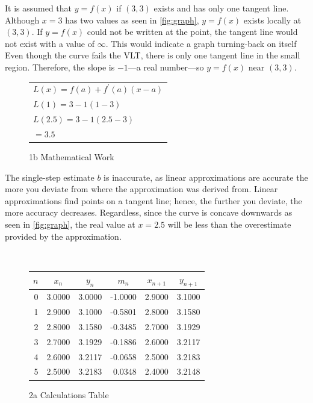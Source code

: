 \documentclass[answers,addpoints]{exam}
\begin{document}
\begin{questions}
\begin{solution}
    It is assumed that $y=f(x)$ if $(3,3)$ exists and has only one tangent line. Although $x=3$ has two values as seen in \ref{fig:graph}, $y=f(x)$ exists locally at $(3,3)$. If $y=f(x)$ could not be written at the point, the tangent line would not exist with a value of $\infty$. This would indicate a graph turning-back on itself Even though the curve fails the VLT, there is only one tangent line in the small region. Therefore, the slope is $-1$—a real number—so $y=f(x)$ near $(3,3)$.

    \begin{figure}[H]
      \centering
      \begin{tabular}{@{}l@{}}
        $\displaystyle L(x)=f(a)+f^\prime(a)(x-a)$ \\[6pt]
        $\displaystyle L(1)=3-1(1-3)$ \\[6pt]
        $\displaystyle L(2.5)=3-1(2.5-3)$ \\[6pt]
        $\displaystyle =3.5$ \\
      \end{tabular}
      \caption{1b Mathematical Work}
      \label{fig:1b-math}
    \end{figure}

    The single-step estimate $b$ is inaccurate, as linear approximations are accurate the more you deviate from where the approximation was derived from. Linear approximations find points on a tangent line; hence, the further you deviate, the more accuracy decreases. Regardless, since the curve is concave downwards as seen in \ref{fig:graph}, the real value at $x=2.5$ will be less than the overestimate provided by the approximation.

  \end{solution}


  \question \
  \begin{solution}

    \begin{figure}[H]
      \centering
      \begin{tabular}{r r r r r r}
        \hline
        \multicolumn{1}{c}{$n$} &
        \multicolumn{1}{c}{$x_n$} &
        \multicolumn{1}{c}{$y_n$} &
        \multicolumn{1}{c}{$m_n$} &
        \multicolumn{1}{c}{$x_{n+1}$} &
        \multicolumn{1}{c}{$y_{n+1}$} \\
        \hline
        0 & 3.0000 & 3.0000 & -1.0000 & 2.9000 & 3.1000 \\
        1 & 2.9000 & 3.1000 & -0.5801 & 2.8000 & 3.1580 \\
        2 & 2.8000 & 3.1580 & -0.3485 & 2.7000 & 3.1929 \\
        3 & 2.7000 & 3.1929 & -0.1886 & 2.6000 & 3.2117 \\
        4 & 2.6000 & 3.2117 & -0.0658 & 2.5000 & 3.2183 \\
        5 & 2.5000 & 3.2183 & 0.0348 & 2.4000 & 3.2148 \\
        \hline
      \end{tabular}
      \caption{2a Calculations Table}
      \label{fig:2a-vi-table}
    \end{figure}


\end{solution}
\end{questions}
\end{document}
